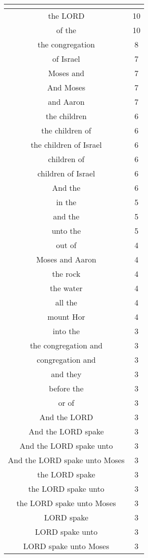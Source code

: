 \begin{center}
\begin{longtable}{|c|c|}
\hline \multicolumn{2}{c}{{ }} \\ \hline
\endfoot 
the LORD & 10\\ \hline 
of the & 10\\ \hline 
the congregation & 8\\ \hline 
of Israel & 7\\ \hline 
Moses and & 7\\ \hline 
And Moses & 7\\ \hline 
and Aaron & 7\\ \hline 
the children & 6\\ \hline 
the children of & 6\\ \hline 
the children of Israel & 6\\ \hline 
children of & 6\\ \hline 
children of Israel & 6\\ \hline 
And the & 6\\ \hline 
in the & 5\\ \hline 
and the & 5\\ \hline 
unto the & 5\\ \hline 
out of & 4\\ \hline 
Moses and Aaron & 4\\ \hline 
the rock & 4\\ \hline 
the water & 4\\ \hline 
all the & 4\\ \hline 
mount Hor & 4\\ \hline 
into the & 3\\ \hline 
the congregation and & 3\\ \hline 
congregation and & 3\\ \hline 
and they & 3\\ \hline 
before the & 3\\ \hline 
or of & 3\\ \hline 
And the LORD & 3\\ \hline 
And the LORD spake & 3\\ \hline 
And the LORD spake unto & 3\\ \hline 
And the LORD spake unto Moses & 3\\ \hline 
the LORD spake & 3\\ \hline 
the LORD spake unto & 3\\ \hline 
the LORD spake unto Moses & 3\\ \hline 
LORD spake & 3\\ \hline 
LORD spake unto & 3\\ \hline 
LORD spake unto Moses & 3\\ \hline 

\end{longtable}
\end{center}

